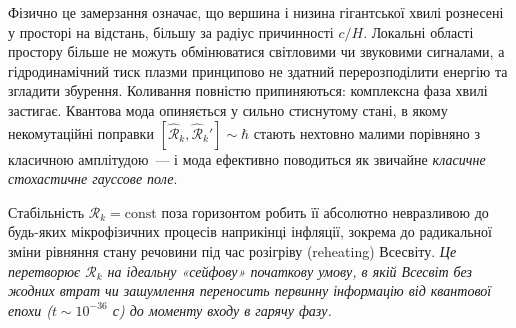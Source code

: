 \begin{enumerate}
    Фізично це замерзання означає, що вершина і низина
    гігантської хвилі рознесені у просторі на відстань,
    більшу за радіус причинності $c/H$. Локальні області
    простору більше не можуть обмінюватися світловими чи
    звуковими сигналами, а гідродинамічний тиск плазми
    принципово не здатний перерозподілити енергію та згладити
    збурення. Коливання повністю припиняються: комплексна
    фаза хвилі застигає. Квантова мода опиняється у сильно
    стиснутому стані, в якому некомутаційні поправки
    $[\hat{\mathcal{R}}_k, \hat{\mathcal{R}}_k'] \sim \hbar$
    стають нехтовно малими порівняно з класичною амплітудою~---
    і мода ефективно поводиться як звичайне
    \emph{класичне стохастичне гауссове поле}.

  Стабільність $\mathcal{R}_k = \mathrm{const}$ поза горизонтом робить її абсолютно невразливою до будь-яких мікрофізичних процесів наприкінці інфляції, зо\-крема до радикальної зміни рівняння стану речовини під час розігріву (reheating) Всесвіту. \emph{Це перетворює $\mathcal{R}_k$ на ідеальну «сейфову» початкову умову, в якій Всесвіт без жодних втрат чи зашумлення переносить первинну інформацію від квантової епохи ($t \sim 10^{-36}$ с) до моменту входу в гарячу фазу.}
\end{enumerate}

